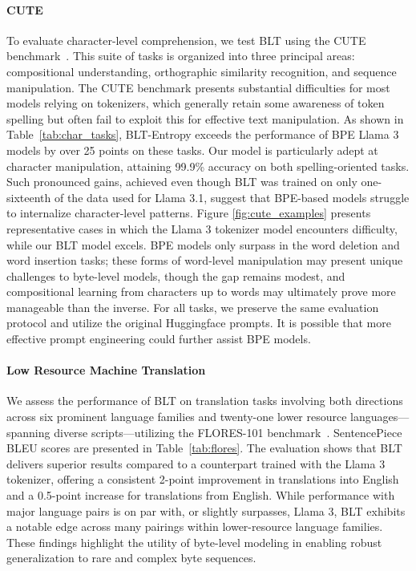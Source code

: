 \paragraph{CUTE}
To evaluate character-level comprehension, we test {\textsc BLT} using the CUTE benchmark~\citep{edman2024cute}. This suite of tasks is organized into three principal areas: compositional understanding, orthographic similarity recognition, and sequence manipulation. The CUTE benchmark presents substantial difficulties for most models relying on tokenizers, which generally retain some awareness of token spelling but often fail to exploit this for effective text manipulation. As shown in Table~\ref{tab:char_tasks}, {\textsc BLT}-Entropy exceeds the performance of BPE Llama 3 models by over 25 points on these tasks. Our model is particularly adept at character manipulation, attaining 99.9\% accuracy on both spelling-oriented tasks. Such pronounced gains, achieved even though {\textsc BLT} was trained on only one-sixteenth of the data used for Llama 3.1, suggest that BPE-based models struggle to internalize character-level patterns. Figure \ref{fig:cute_examples} presents representative cases in which the Llama 3 tokenizer model encounters difficulty, while our {\textsc BLT} model excels. BPE models only surpass in the word deletion and word insertion tasks; these forms of word-level manipulation may present unique challenges to byte-level models, though the gap remains modest, and compositional learning from characters up to words may ultimately prove more manageable than the inverse. For all tasks, we preserve the same evaluation protocol and utilize the original Huggingface prompts. It is possible that more effective prompt engineering could further assist BPE models.

\paragraph{Low Resource Machine Translation} We assess the performance of {\textsc BLT} on translation tasks involving both directions across six prominent language families and twenty-one lower resource languages—spanning diverse scripts—utilizing the FLORES-101 benchmark~\citep{goyal2022flores}. SentencePiece BLEU scores are presented in Table~\ref{tab:flores}. The evaluation shows that {\textsc BLT} delivers superior results compared to a counterpart trained with the Llama 3 tokenizer, offering a consistent 2-point improvement in translations into English and a 0.5-point increase for translations from English. While performance with major language pairs is on par with, or slightly surpasses, Llama 3, {\textsc BLT} exhibits a notable edge across many pairings within lower-resource language families. These findings highlight the utility of byte-level modeling in enabling robust generalization to rare and complex byte sequences.

